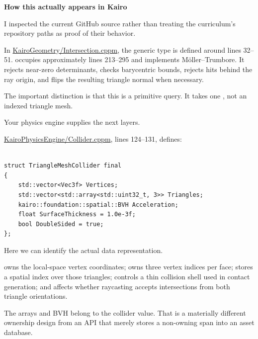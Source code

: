 \textbf{How this actually appears in Kairo}

I inspected the current GitHub source rather than treating the curriculum's repository paths as proof of their behavior.

In \href{https://github.com/swayam8624/KairoGeometry/blob/master/Intersection.cppm?utm_source=chatgpt.com}{KairoGeometry/Intersection.cppm}, the generic  type is defined around lines 32--51.  occupies approximately lines 213--295 and implements Möller--Trumbore. It rejects near-zero determinants, checks barycentric bounds, rejects hits behind the ray origin, and flips the resulting triangle normal when necessary.

The important distinction is that this is a primitive query. It takes one , not an indexed triangle mesh.

Your physics engine supplies the next layers.

\href{https://github.com/swayam8624/KairoPhysicsEngine/blob/main/Collider.cppm?utm_source=chatgpt.com}{KairoPhysicsEngine/Collider.cppm}, lines 124--131, defines:

\begin{verbatim}

struct TriangleMeshCollider final
{
    std::vector<Vec3f> Vertices;
    std::vector<std::array<std::uint32_t, 3>> Triangles;
    kairo::foundation::spatial::BVH Acceleration;
    float SurfaceThickness = 1.0e-3f;
    bool DoubleSided = true;
};
\end{verbatim}

Here we can identify the actual data representation.

 owns the local-space vertex coordinates;  owns three vertex indices per face;  stores a spatial index over those triangles;  controls a thin collision shell used in contact generation; and  affects whether raycasting accepts intersections from both triangle orientations.

The arrays and BVH belong to the collider value. That is a materially different ownership design from an API that merely stores a non-owning span into an asset database.

